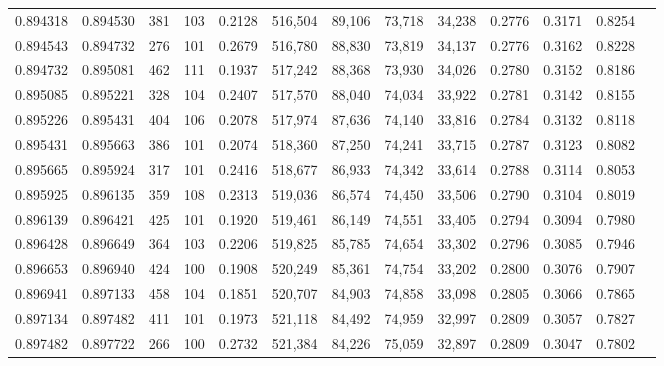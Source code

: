 \begin{tabular}{rrrrrrrrrrrrr}
0.894318 & 0.894530 &   381 & 103 &                                     0.2128 & 516,504 &  89,106 &  73,718 &  34,238 & 0.2776 & 0.3171 & 0.8254 \\
0.894543 & 0.894732 &   276 & 101 &                                     0.2679 & 516,780 &  88,830 &  73,819 &  34,137 & 0.2776 & 0.3162 & 0.8228 \\
0.894732 & 0.895081 &   462 & 111 &                                     0.1937 & 517,242 &  88,368 &  73,930 &  34,026 & 0.2780 & 0.3152 & 0.8186 \\
0.895085 & 0.895221 &   328 & 104 &                                     0.2407 & 517,570 &  88,040 &  74,034 &  33,922 & 0.2781 & 0.3142 & 0.8155 \\
0.895226 & 0.895431 &   404 & 106 &                                     0.2078 & 517,974 &  87,636 &  74,140 &  33,816 & 0.2784 & 0.3132 & 0.8118 \\
0.895431 & 0.895663 &   386 & 101 &                                     0.2074 & 518,360 &  87,250 &  74,241 &  33,715 & 0.2787 & 0.3123 & 0.8082 \\
0.895665 & 0.895924 &   317 & 101 &                                     0.2416 & 518,677 &  86,933 &  74,342 &  33,614 & 0.2788 & 0.3114 & 0.8053 \\
0.895925 & 0.896135 &   359 & 108 &                                     0.2313 & 519,036 &  86,574 &  74,450 &  33,506 & 0.2790 & 0.3104 & 0.8019 \\
0.896139 & 0.896421 &   425 & 101 &                                     0.1920 & 519,461 &  86,149 &  74,551 &  33,405 & 0.2794 & 0.3094 & 0.7980 \\
0.896428 & 0.896649 &   364 & 103 &                                     0.2206 & 519,825 &  85,785 &  74,654 &  33,302 & 0.2796 & 0.3085 & 0.7946 \\
0.896653 & 0.896940 &   424 & 100 &                                     0.1908 & 520,249 &  85,361 &  74,754 &  33,202 & 0.2800 & 0.3076 & 0.7907 \\
0.896941 & 0.897133 &   458 & 104 &                                     0.1851 & 520,707 &  84,903 &  74,858 &  33,098 & 0.2805 & 0.3066 & 0.7865 \\
0.897134 & 0.897482 &   411 & 101 &                                     0.1973 & 521,118 &  84,492 &  74,959 &  32,997 & 0.2809 & 0.3057 & 0.7827 \\
0.897482 & 0.897722 &   266 & 100 &                                     0.2732 & 521,384 &  84,226 &  75,059 &  32,897 & 0.2809 & 0.3047 & 0.7802 \\

\end{tabular}
